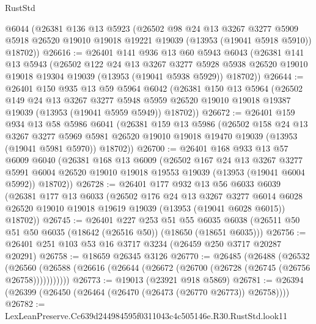 \begin{lexlean}{RustStd}
\begin{coremodule}
    @6044
    (@26381
      @136
      @13
      @5923
      (@26502
        @98
        @24
        @13
        @3267
        @3277
        @5909
        @5918
        @26520
        @19010
        @19018
        @19221
        @19039
        (@13953 (@19041 @5918 @5910))
        @18702))
@26616 := @26401
    @141
    @936
    @13
    @60
    @5943
    @6043
    (@26381
      @141
      @13
      @5943
      (@26502
        @122
        @24
        @13
        @3267
        @3277
        @5928
        @5938
        @26520
        @19010
        @19018
        @19304
        @19039
        (@13953 (@19041 @5938 @5929))
        @18702))
@26644 := @26401
    @150
    @935
    @13
    @59
    @5964
    @6042
    (@26381
      @150
      @13
      @5964
      (@26502
        @149
        @24
        @13
        @3267
        @3277
        @5948
        @5959
        @26520
        @19010
        @19018
        @19387
        @19039
        (@13953 (@19041 @5959 @5949))
        @18702))
@26672 := @26401
    @159
    @934
    @13
    @58
    @5986
    @6041
    (@26381
      @159
      @13
      @5986
      (@26502
        @158
        @24
        @13
        @3267
        @3277
        @5969
        @5981
        @26520
        @19010
        @19018
        @19470
        @19039
        (@13953 (@19041 @5981 @5970))
        @18702))
@26700 := @26401
    @168
    @933
    @13
    @57
    @6009
    @6040
    (@26381
      @168
      @13
      @6009
      (@26502
        @167
        @24
        @13
        @3267
        @3277
        @5991
        @6004
        @26520
        @19010
        @19018
        @19553
        @19039
        (@13953 (@19041 @6004 @5992))
        @18702))
@26728 := @26401
    @177
    @932
    @13
    @56
    @6033
    @6039
    (@26381
      @177
      @13
      @6033
      (@26502
        @176
        @24
        @13
        @3267
        @3277
        @6014
        @6028
        @26520
        @19010
        @19018
        @19619
        @19039
        (@13953 (@19041 @6028 @6015))
        @18702))
@26745 := @26401
    @227
    @253
    @51
    @55
    @6035
    @6038
    (@26511 @50 @51 @50 @6035 (@18642 (@26516 @50)) (@18650 (@18651 @6035)))
@26756 := @26401 @251 @103 @53 @16 @3717 @3234 (@26459 @250 @3717 @20287 @20291)
@26758 := @18659 @26345 @3126
@26770 := @26485
    (@26488
      (@26532
        (@26560 (@26588 (@26616 (@26644 (@26672 (@26700 (@26728 (@26745 (@26756 @26758)))))))))))
@26773 := @19013 (@23921 @918 @5869)
@26781 := @26394 (@26399 (@26450 (@26464 (@26470 (@26473 (@26770 @26773)) @26758))))
@26782 := LexLeanPreserve.Cc639d244984595f0311043c4c505146e.R30.RustStd.look11

\end{coremodule}
\end{lexlean}
